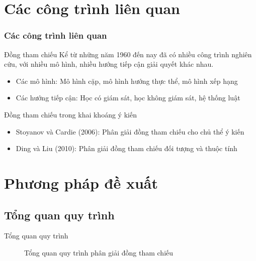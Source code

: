 \documentclass[9pt,xcolor=table,hyperref=unicode]{beamer}
\begin{document}
	\section{Các công trình liên quan}
	\begin{frame}
		\frametitle{Các công trình liên quan}
		\begin{block}{Đồng tham chiếu}
			Kể từ những năm 1960 đến nay đã có nhiều công trình nghiên cứu, với nhiều mô hình, nhiều hướng tiếp cận giải quyết khác nhau.
			\begin{itemize}
				\item{Các mô hình: Mô hình cặp, mô hình hướng thực thể, mô hình xếp hạng}
				\item{Các hướng tiếp cận: Học có giám sát, học không giám sát, hệ thống luật}
			\end{itemize}
		\end{block}
		\begin{block}{Đồng tham chiếu trong khai khoáng ý kiến}
			\begin{itemize}
				\item{Stoyanov và Cardie (2006): Phân giải đồng tham chiếu cho chủ thể ý kiến}
				\item{Ding và Liu (2010): Phân giải đồng tham chiếu đối tượng và thuộc tính \footnotemark}
			\end{itemize}
		\end{block}
	\end{frame}

	\section{Phương pháp đề xuất}
	\subsection{Tổng quan quy trình}
	\begin{frame}{Tổng quan quy trình}		
		\begin{figure}[H]
			\LARGE 
			\centering				
			\resizebox{100mm}{!}{}
			\caption{Tổng quan quy trình phân giải đồng tham chiếu}	
			\label{fig:generalmodel}						
		\end{figure}
	\end{frame}	
\end{document}
